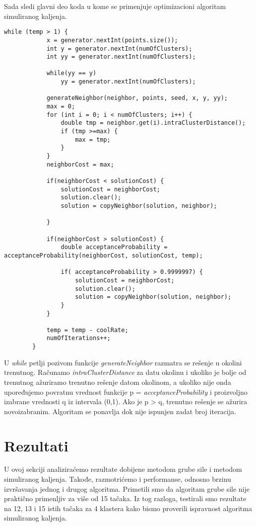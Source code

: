 \documentclass[a4paper]{article}
\begin{document}
Sada sledi glavni deo koda u kome se primenjuje optimizacioni algoritam simuliranog kaljenja.
\begin{lstlisting}[title=Program 7: Simulirano kaljenje]
		while (temp > 1) {
			x = generator.nextInt(points.size());
			int y = generator.nextInt(numOfClusters);
			int yy = generator.nextInt(numOfClusters); 

			while(yy == y) 
				yy = generator.nextInt(numOfClusters);

			generateNeighbor(neighbor, points, seed, x, y, yy);	
			max = 0;
			for (int i = 0; i < numOfClusters; i++) {
				double tmp = neighbor.get(i).intraClusterDistance();
				if (tmp >=max) {
					max = tmp;
				}
			}	
			neighborCost = max;
			
			if(neighborCost < solutionCost) {
				solutionCost = neighborCost;
				solution.clear();
				solution = copyNeighbor(solution, neighbor);
	
			}
			
			if(neighborCost > solutionCost) {
				double acceptanceProbability = acceptanceProbability(neighborCost, solutionCost, temp);

				if( acceptanceProbability > 0.9999997) {
					solutionCost = neighborCost;
					solution.clear();
					solution = copyNeighbor(solution, neighbor);
				}
			}

			temp = temp - coolRate;
			numOfIterations++;
		} 
\end{lstlisting}

U \textit{while} petlji pozivom funkcije \textit{generateNeighbor} razmatra se rešenje u okolini trenutnog. Računamo \textit{intraClusterDistance} za datu okolinu i ukoliko je bolje od trenutnog ažuriramo trenutno rešenje datom okolinom, a ukoliko nije onda upoređujemo povratnu vrednost funkcije p = \textit{acceptanceProbability} i proizvoljno izabrane vrednosti q iz intervala (0,1). Ako je p > q, trenutno rešenje se ažurira novoizabranim. Algoritam se ponavlja dok nije ispunjen zadat broj iteracija. 


\section{Rezultati}
U ovoj sekciji analiziraćemo rezultate dobijene metodom grube sile i metodom simuliranog kaljenja. Takođe, razmotrićemo i performanse, odnosno brzinu izvršavanja jednog i drugog algoritma. Primetili smo da algoritam grube sile nije praktično primenljiv za više od 15 tačaka. Iz tog razloga, testirali smo rezultate na 12, 13 i 15 istih tačaka za 4 klastera kako bismo proverili ispravnost algoritma simuliranog kaljenja. 
\end{document}
